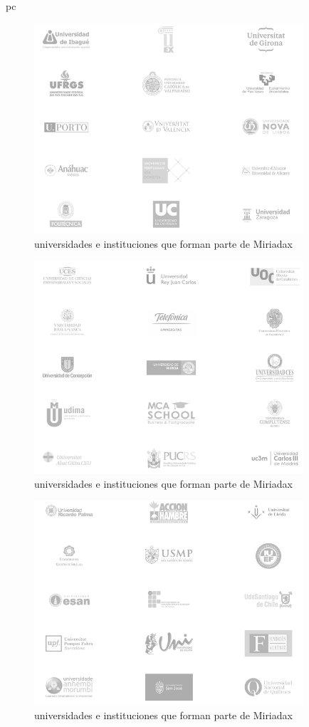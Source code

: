 pc\documentclass[a4paper,12pt,openany]{book}
\begin{document}
\begin{figure}[ht]
  \centering
	\includegraphics[width=10cm]{miriada10-2.png}
\caption{universidades e instituciones que forman parte de Miriadax}
  \label{fig:miriada10-2}
\end{figure}

\begin{figure}[ht]
  \centering
	\includegraphics[width=10cm]{miriada10-3.png}
\caption{universidades e instituciones que forman parte de Miriadax}
  \label{fig:miriada10-3}
\end{figure}

\begin{figure}[ht]
  \centering
	\includegraphics[width=10cm]{miriada10-4.png}
\caption{universidades e instituciones que forman parte de Miriadax}
  \label{fig:miriada10-4}
\end{figure}
\end{document}
